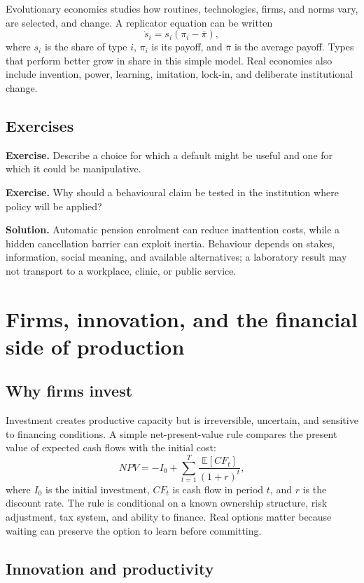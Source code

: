 \documentclass[11pt,oneside,openany]{book}
\newcommand{\E}{\mathbb{E}}
\newcommand{\exercise}[1]{\textbf{Exercise.} #1}
\newcommand{\solution}[1]{\textbf{Solution.} #1}
\begin{document}
Evolutionary economics studies how routines, technologies, firms, and norms vary, are selected, and change. A replicator equation can be written
\[
  \dot{s}_i=s_i\left(\pi_i-\bar{\pi}\right),
\]
where $s_i$ is the share of type $i$, $\pi_i$ is its payoff, and $\bar{\pi}$ is the average payoff. Types that perform better grow in share in this simple model. Real economies also include invention, power, learning, imitation, lock-in, and deliberate institutional change.

\section{Exercises}

\exercise{Describe a choice for which a default might be useful and one for which it could be manipulative.}

\exercise{Why should a behavioural claim be tested in the institution where policy will be applied?}

\solution{Automatic pension enrolment can reduce inattention costs, while a hidden cancellation barrier can exploit inertia. Behaviour depends on stakes, information, social meaning, and available alternatives; a laboratory result may not transport to a workplace, clinic, or public service.}

\chapter{Firms, innovation, and the financial side of production}
\label{ch:firms}

\section{Why firms invest}

Investment creates productive capacity but is irreversible, uncertain, and sensitive to financing conditions. A simple net-present-value rule compares the present value of expected cash flows with the initial cost:
\[
  NPV=-I_0+\sum_{t=1}^{T}\frac{\E[CF_t]}{(1+r)^t},
\]
where $I_0$ is the initial investment, $CF_t$ is cash flow in period $t$, and $r$ is the discount rate. The rule is conditional on a known ownership structure, risk adjustment, tax system, and ability to finance. Real options matter because waiting can preserve the option to learn before committing.

\section{Innovation and productivity}
\end{document}
